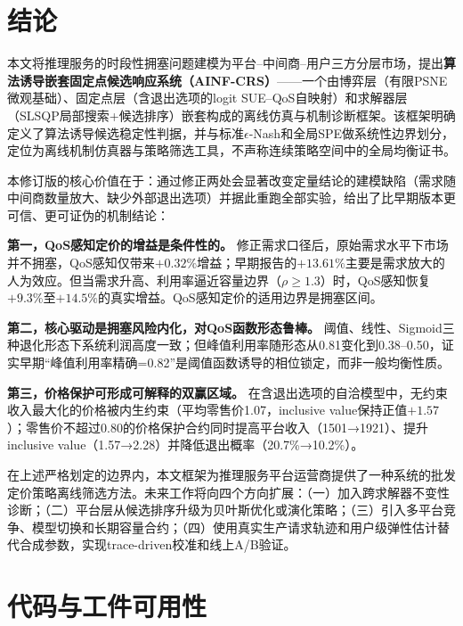 \documentclass[UTF8,11pt]{ctexart}
\begin{document}
\section{结论}
\label{sec:conclusion}

本文将推理服务的时段性拥塞问题建模为平台--中间商--用户三方分层市场，提出\textbf{算法诱导嵌套固定点候选响应系统（AINF-CRS）}——一个由博弈层（有限PSNE微观基础）、固定点层（含退出选项的logit SUE--QoS自映射）和求解器层（SLSQP局部搜索+候选排序）嵌套构成的离线仿真与机制诊断框架。该框架明确定义了算法诱导候选稳定性判据，并与标准$\epsilon$-Nash和全局SPE做系统性边界划分，定位为离线机制仿真器与策略筛选工具，不声称连续策略空间中的全局均衡证书。

本修订版的核心价值在于：通过修正两处会显著改变定量结论的建模缺陷（需求随中间商数量放大、缺少外部退出选项）并据此重跑全部实验，给出了比早期版本更可信、更可证伪的机制结论：

\textbf{第一，QoS感知定价的增益是条件性的。} 修正需求口径后，原始需求水平下市场并不拥塞，QoS感知仅带来$+0.32\%$增益；早期报告的$+13.61\%$主要是需求放大的人为效应。但当需求升高、利用率逼近容量边界（$\rho\ge1.3$）时，QoS感知恢复$+9.3\%$至$+14.5\%$的真实增益。QoS感知定价的适用边界是拥塞区间。

\textbf{第二，核心驱动是拥塞风险内化，对QoS函数形态鲁棒。} 阈值、线性、Sigmoid三种退化形态下系统利润高度一致；但峰值利用率随形态从0.81变化到0.38--0.50，证实早期“峰值利用率精确=0.82”是阈值函数诱导的相位锁定，而非一般均衡性质。

\textbf{第三，价格保护可形成可解释的双赢区域。} 在含退出选项的自洽模型中，无约束收入最大化的价格被内生约束（平均零售价1.07，inclusive value保持正值$+1.57$）；零售价不超过0.80的价格保护合约同时提高平台收入（1501→1921）、提升inclusive value（1.57→2.28）并降低退出概率（20.7\%→10.2\%）。

在上述严格划定的边界内，本文框架为推理服务平台运营商提供了一种系统的批发定价策略离线筛选方法。未来工作将向四个方向扩展：（一）加入跨求解器不变性诊断；（二）平台层从候选排序升级为贝叶斯优化或演化策略；（三）引入多平台竞争、模型切换和长期容量合约；（四）使用真实生产请求轨迹和用户级弹性估计替代合成参数，实现trace-driven校准和线上A/B验证。

\section{代码与工件可用性}
\label{sec:code_availability}
\end{document}
